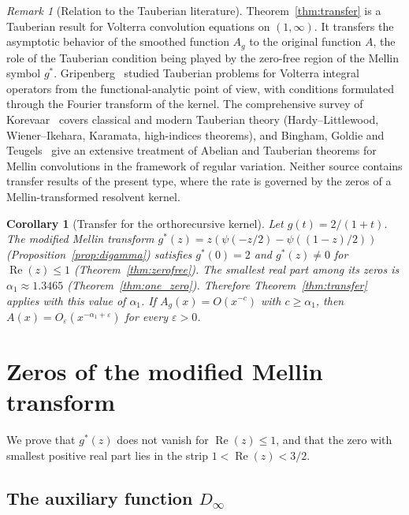 \documentclass[11pt]{amsart}
\newtheorem{corollary}[theorem]{Corollary}
\theoremstyle{definition}
\theoremstyle{remark}
\newtheorem{remark}[theorem]{Remark}
\newcommand{\eps}{\varepsilon}
\newcommand{\Real}{\operatorname{Re}}
\begin{document}
\begin{remark}[Relation to the Tauberian literature]\label{rem:literature}
Theorem~\ref{thm:transfer} is a Tauberian result for Volterra convolution equations on $(1,\infty)$. It transfers the asymptotic behavior of the smoothed function $A_g$ to the original function $A$, the role of the Tauberian condition being played by the zero-free region of the Mellin symbol $g^*$. Gripenberg~\cite{Gripenberg} studied Tauberian problems for Volterra integral operators from the functional-analytic point of view, with conditions formulated through the Fourier transform of the kernel. The comprehensive survey of Korevaar~\cite{Korevaar} covers classical and modern Tauberian theory (Hardy--Littlewood, Wiener--Ikehara, Karamata, high-indices theorems), and Bingham, Goldie and Teugels~\cite{BGT} give an extensive treatment of Abelian and Tauberian theorems for Mellin convolutions in the framework of regular variation. Neither source contains transfer results of the present type, where the rate is governed by the zeros of a Mellin-transformed resolvent kernel.
\end{remark}

\begin{corollary}[Transfer for the orthorecursive kernel]\label{cor:transfer}
Let $g(t) = 2/(1+t)$. The modified Mellin transform $g^*(z) = z(\psi(-z/2) - \psi((1-z)/2))$ (Proposition~\ref{prop:digamma}) satisfies $g^*(0) = 2$ and $g^*(z) \neq 0$ for $\Real(z) \leq 1$ (Theorem~\ref{thm:zerofree}). The smallest real part among its zeros is $\alpha_1 \approx 1.3465$ (Theorem~\ref{thm:one_zero}). Therefore Theorem~\ref{thm:transfer} applies with this value of $\alpha_1$. If $A_g(x) = O(x^{-c})$ with $c \geq \alpha_1$, then $A(x) = O_\eps(x^{-\alpha_1+\eps})$ for every $\eps > 0$.
\end{corollary}


\section{Zeros of the modified Mellin transform}\label{sec:spectral}

We prove that $g^*(z)$ does not vanish for $\Real(z) \leq 1$, and that the zero with smallest positive real part lies in the strip $1 < \Real(z) < 3/2$.


\subsection{The auxiliary function $D_\infty$}
\end{document}
